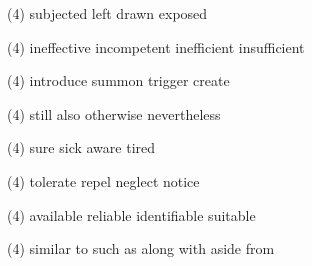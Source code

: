 \begin{tasks}(4)
	\task subjected
	\task left
	\task drawn
	\task exposed
\end{tasks}
\item
\begin{tasks}(4)
	\task ineffective
	\task incompetent
	\task inefficient
	\task insufficient
\end{tasks}
\item
\begin{tasks}(4)
	\task introduce
	\task summon
	\task trigger
	\task create
\end{tasks}
\item
\begin{tasks}(4)
	\task still
	\task also
	\task otherwise
	\task nevertheless
\end{tasks}
\item
\begin{tasks}(4)
	\task sure
	\task sick
	\task aware
	\task tired
\end{tasks}
\item
\begin{tasks}(4)
	\task tolerate
	\task repel
	\task neglect
	\task notice
\end{tasks}
\item
\begin{tasks}(4)
	\task available
	\task reliable
	\task identifiable
	\task suitable
\end{tasks}
\item
\begin{tasks}(4)
	\task similar to
	\task such as
	\task along with
	\task aside from
\end{tasks}
